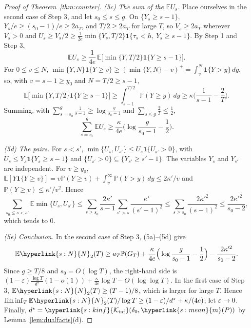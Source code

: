 \documentclass[11pt]{article}
\newcommand{\E}{\mathbb{E}}
\newcommand{\Prob}{\mathbb{P}}
\newcommand{\ind}{\mathbf{1}}
\newcommand{\sy}[2]{{\hyperlink{#1}{#2}}}
\newcommand{\mean}{\sy{s:mean}{m}}
\newcommand{\Kinf}{\sy{s:kinf}{\mathcal{K}_{\inf}}}
\newcommand{\Np}{\sy{s:N}{N}}
\begin{document}
\begin{proof}[Proof of Theorem~\ref{thm:counter}]
\emph{(5c) The sum of the $\E U_s$.} Place ourselves in the second case of Step 3, and let
$s_0\le s\le g$. On $\{Y_s\ge s-1\}$, $Y_s/e\ge(s_0-1)/e\ge2a_T$, and $T/2\ge2a_T$ for large $T$,
so $V_s\ge2a_T$ wherever $V_s>0$ and $U_s\ge V_s/2\ge\frac1{2e}\min\{Y_s,T/2\}\ind\{\tau_s<h,\ Y_s\ge s-1\}$.
By Step 1 and Step 3,
\[
  \E U_s\ge\frac1{4e}\,\E\big[\min\{Y,T/2\}\ind\{Y\ge s-1\}\big].
\]
For $0\le v\le N$, $\min\{Y,N\}\ind\{Y\ge v\}\ge(\min\{Y,N\}-v)^+=\int_v^N\ind\{Y>y\}\,dy$, so, with
$v=s-1\ge y_0$ and $N=T/2\ge s-1$,
\[
  \E\big[\min\{Y,T/2\}\ind\{Y\ge s-1\}\big]\ge\int_{s-1}^{T/2}\Prob(Y\ge y)\,dy
  \ge\kappa\Big(\frac{1}{s-1}-\frac2T\Big).
\]
Summing, with $\sum_{s=s_0}^g\frac1{s-1}\ge\log\frac{g}{s_0-1}$ and $\sum_{s\le g}\frac2T\le\frac12$,
\[
  \sum_{s=s_0}^g\E U_s\ge\frac{\kappa}{4e}\Big(\log\frac{g}{s_0-1}-\frac12\Big).
\]

\emph{(5d) The pairs.} For $s<s'$, $\min\{U_s,U_{s'}\}\le U_s\ind\{U_{s'}>0\}$, with
$U_s\le Y_s\ind\{Y_s\ge s-1\}$ and $\{U_{s'}>0\}\subseteq\{Y_{s'}\ge s'-1\}$. The variables $Y_s$ and
$Y_{s'}$ are independent. For $v\ge y_0$,
$\E[Y\ind\{Y\ge v\}]=v\Prob(Y\ge v)+\int_v^\infty\Prob(Y>y)\,dy\le2\kappa'/v$ and
$\Prob(Y\ge v)\le\kappa'/v^2$. Hence
\[
  \sum_{s_0\le s<s'}\E\min\{U_s,U_{s'}\}\le\sum_{s\ge s_0}\frac{2\kappa'}{s-1}\sum_{s'>s}\frac{\kappa'}{(s'-1)^2}
  \le\sum_{s\ge s_0}\frac{2\kappa'^2}{(s-1)^2}\le\frac{2\kappa'^2}{s_0-2},
\]
which tends to $0$.

\emph{(5e) Conclusion.} In the second case of Step 3, (5a)--(5d) give
\[
  \E \Np_2(T)\ge a_T\Prob(G_T)+\frac{\kappa}{4e}\Big(\log\frac{g}{s_0-1}-\frac12\Big)-\frac{2\kappa'^2}{s_0-2}.
\]
Since $g\ge T/8$ and $s_0=O(\log T)$, the right-hand side is
$(1-\varepsilon)\frac{\log T}{d^\star}(1-o(1))+\frac{\kappa}{4e}\log T-O(\log\log T)$. In the first case
of Step 3, $\E \Np_2(T)\ge(T-1)/8$, which is larger for large $T$. Hence
$\liminf_T\E \Np_2(T)/\log T\ge(1-\varepsilon)/d^\star+\kappa/(4e)$; let $\varepsilon\to0$. Finally,
$d^\star=\Kinf(\delta_0,\mean(P))$ by Lemma~\ref{lem:dualfacts}(d).
\end{proof}
\end{document}
